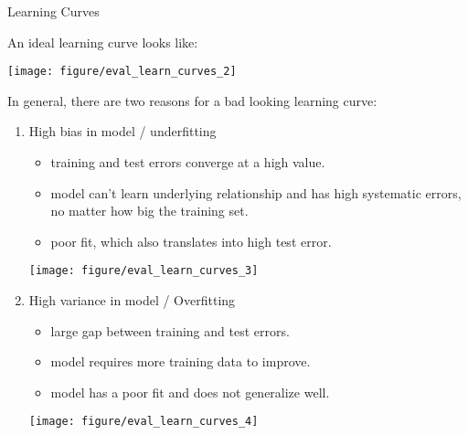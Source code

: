 \begin{vbframe}{Learning Curves}
\begin{knitrout}
{}



\end{knitrout}

\framebreak

An ideal learning curve looks like:

\begin{knitrout}\scriptsize
{}\color{fgcolor}

{\centering \texttt{[image: figure/eval\_learn\_curves\_2]} 

}



\end{knitrout}


\framebreak

In general, there are two reasons for a bad looking learning curve:

\begin{enumerate}
\item High bias in model / underfitting
\begin{itemize}
\item training and test errors converge at a high value.
\item model can't learn underlying relationship and has high systematic errors, no matter how big the training set.
\item poor fit, which also translates into high test error.
\end{itemize}

\begin{knitrout}\scriptsize
{}\color{fgcolor}

{\centering \texttt{[image: figure/eval\_learn\_curves\_3]} 

}



\end{knitrout}

\framebreak

\item High variance in model / Overfitting
\begin{itemize}
\item large gap between training and test errors.
\item model requires more training data to improve.
\item model has a poor fit and does not generalize well.
\end{itemize}

\begin{knitrout}\scriptsize
{}\color{fgcolor}

{\centering \texttt{[image: figure/eval\_learn\_curves\_4]} 

}



\end{knitrout}
\end{enumerate}
\end{vbframe}

\endlecture


